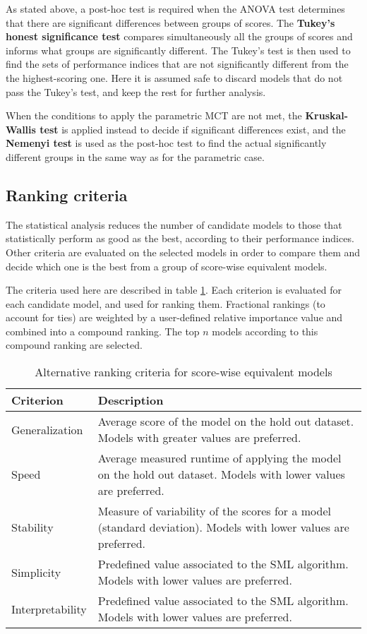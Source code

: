 As stated above, a post-hoc test is required when the ANOVA test determines that there are
significant differences between groups of scores. The {\bf Tukey's honest significance test} compares
simultaneously all the groups of scores and informs what groups are significantly different. The
Tukey's test is then used to find the sets of performance indices that are not significantly
different from the the highest-scoring one. Here it is assumed safe to discard models that do not
pass the Tukey's test, and keep the rest for further analysis.

When the conditions to apply the parametric MCT are not met, the {\bf Kruskal-Wallis test} is
applied instead to decide if significant differences exist, and the {\bf Nemenyi test} is used as
the post-hoc test to find the actual significantly different groups in the same way as for the
parametric case.

\subsection{Ranking criteria}
The statistical analysis reduces the number of candidate models to those that statistically perform
as good as the best, according to their performance indices. Other criteria are evaluated on the
selected models in order to compare them and decide which one is the best from a group of score-wise
equivalent models.

The criteria used here are described in table \ref{tab:ranking}. Each criterion is evaluated for each
candidate model, and used for ranking them. Fractional rankings (to account for ties) are weighted by
a user-defined relative importance value and combined into a compound ranking. The top $n$ models
according to this compound ranking are selected.

\begin{table}[here]
	\centering
	\begingroup
	\begin{tabularx}{\textwidth}{| l X |}
	\hline
	Criterion & Description \\
	\hline
	Generalization & Average score of the model on the hold out dataset. Models with greater values
	are preferred.\\
	Speed & Average measured runtime of applying the model on the hold out dataset. Models with
	lower values are preferred.\\ Stability & Measure of variability of the scores for a model
	(standard deviation). Models with lower values are preferred. \\
	Simplicity & Predefined value associated to the SML algorithm. Models with lower values are
	preferred.\\
	Interpretability & Predefined value associated to the SML algorithm. Models with lower values
	are preferred.\\
	\hline
	\end{tabularx}
	\endgroup
	\caption{Alternative ranking criteria for score-wise equivalent models}
	\label{tab:ranking}
\end{table}



